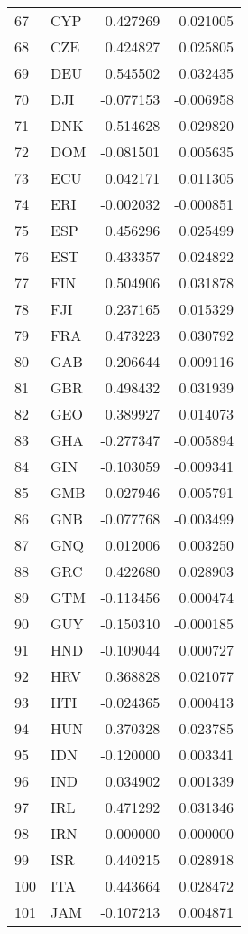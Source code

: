 \begin{tabular}{llrr}
67 & CYP & 0.427269 & 0.021005 \\
68 & CZE & 0.424827 & 0.025805 \\
69 & DEU & 0.545502 & 0.032435 \\
70 & DJI & -0.077153 & -0.006958 \\
71 & DNK & 0.514628 & 0.029820 \\
72 & DOM & -0.081501 & 0.005635 \\
73 & ECU & 0.042171 & 0.011305 \\
74 & ERI & -0.002032 & -0.000851 \\
75 & ESP & 0.456296 & 0.025499 \\
76 & EST & 0.433357 & 0.024822 \\
77 & FIN & 0.504906 & 0.031878 \\
78 & FJI & 0.237165 & 0.015329 \\
79 & FRA & 0.473223 & 0.030792 \\
80 & GAB & 0.206644 & 0.009116 \\
81 & GBR & 0.498432 & 0.031939 \\
82 & GEO & 0.389927 & 0.014073 \\
83 & GHA & -0.277347 & -0.005894 \\
84 & GIN & -0.103059 & -0.009341 \\
85 & GMB & -0.027946 & -0.005791 \\
86 & GNB & -0.077768 & -0.003499 \\
87 & GNQ & 0.012006 & 0.003250 \\
88 & GRC & 0.422680 & 0.028903 \\
89 & GTM & -0.113456 & 0.000474 \\
90 & GUY & -0.150310 & -0.000185 \\
91 & HND & -0.109044 & 0.000727 \\
92 & HRV & 0.368828 & 0.021077 \\
93 & HTI & -0.024365 & 0.000413 \\
94 & HUN & 0.370328 & 0.023785 \\
95 & IDN & -0.120000 & 0.003341 \\
96 & IND & 0.034902 & 0.001339 \\
97 & IRL & 0.471292 & 0.031346 \\
98 & IRN & 0.000000 & 0.000000 \\
99 & ISR & 0.440215 & 0.028918 \\
100 & ITA & 0.443664 & 0.028472 \\
101 & JAM & -0.107213 & 0.004871 \\

\end{tabular}
